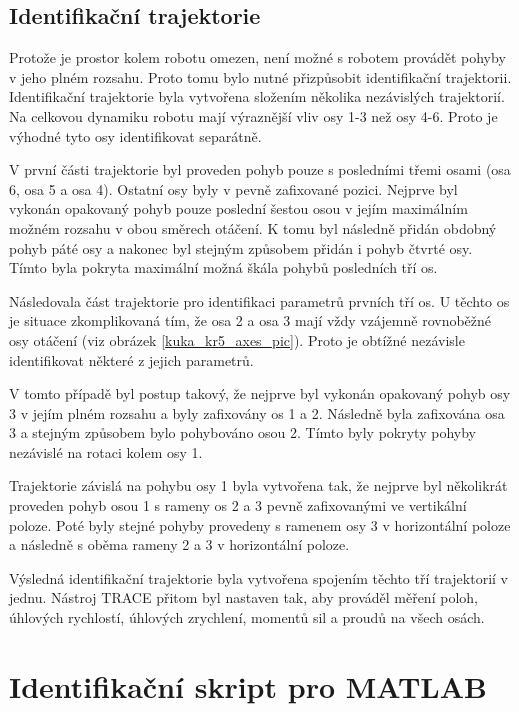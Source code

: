 \label{postup_identifikace_ch}

\subsection{Identifikační trajektorie}

Protože je prostor kolem robotu omezen, není možné s robotem provádět pohyby v jeho plném rozsahu. Proto tomu bylo nutné přizpůsobit identifikační trajektorii. Identifikační trajektorie byla vytvořena složením několika nezávislých trajektorií. Na celkovou dynamiku robotu mají výraznější vliv osy 1-3 než osy 4-6. Proto je výhodné tyto osy identifikovat separátně. 

V první části trajektorie byl proveden pohyb pouze s posledními třemi osami (osa 6, osa 5 a osa 4). Ostatní osy byly v pevně zafixované pozici. Nejprve byl vykonán opakovaný pohyb pouze poslední šestou osou v jejím maximálním možném rozsahu v obou směrech otáčení. K tomu byl následně přidán obdobný pohyb páté osy a nakonec byl stejným způsobem přidán i pohyb čtvrté osy. Tímto byla pokryta maximální možná škála pohybů posledních tří os.

Následovala část trajektorie pro identifikaci parametrů prvních tří os. U těchto os je situace zkomplikovaná tím, že osa 2 a osa 3 mají vždy vzájemně rovnoběžné osy otáčení (viz obrázek \ref{kuka_kr5_axes_pic}). Proto je obtížné nezávisle identifikovat některé z jejich parametrů. 

V tomto případě byl postup takový, že nejprve byl vykonán opakovaný pohyb osy 3 v jejím plném rozsahu a byly zafixovány os 1 a 2. Následně byla zafixována osa 3 a stejným způsobem bylo pohybováno osou 2. Tímto byly pokryty pohyby nezávislé na rotaci kolem osy 1. 

Trajektorie závislá na pohybu osy 1 byla vytvořena tak, že nejprve byl několikrát proveden pohyb osou 1 s rameny os 2 a 3 pevně zafixovanými ve vertikální poloze. Poté byly stejné pohyby provedeny s ramenem osy 3 v horizontální poloze a následně s oběma rameny 2 a 3 v horizontální poloze.

Výsledná identifikační trajektorie byla vytvořena spojením těchto tří trajektorií v jednu. Nástroj TRACE přitom byl nastaven tak, aby prováděl měření poloh, úhlových rychlostí, úhlových zrychlení, momentů sil a proudů na všech osách. 

\section{Identifikační skript pro MATLAB}

